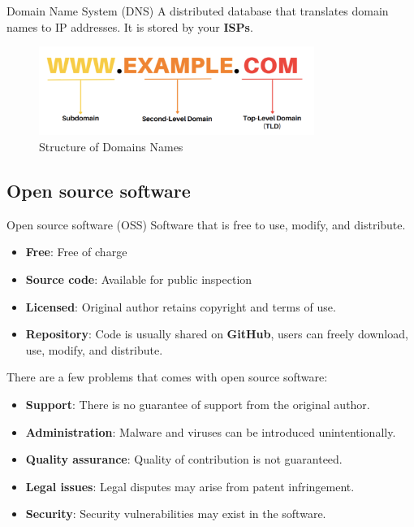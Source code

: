 \begin{definition}
    {Domain Name System (DNS)}
    A distributed database that translates domain names to IP addresses. It is stored by your \textbf{ISPs}.
\end{definition}

\begin{figure}[h!]
    \centering
    \includegraphics[width=0.8\textwidth]{images/tld.png}
    \caption{Structure of Domains Names}
    \label{fig:tld_structure}
\end{figure}

\subsection{Open source software}

\begin{definition}
    {Open source software (OSS)}
    Software that is free to use, modify, and distribute.
    \begin{itemize}
        \item \textbf{Free}: Free of charge
        \item \textbf{Source code}: Available for public inspection
        \item \textbf{Licensed}: Original author retains copyright and terms of use.
        \item \textbf{Repository}: Code is usually shared on \textbf{GitHub}, users can freely download, use, modify, and distribute.
    \end{itemize}
\end{definition}

There are a few problems that comes with open source software:

\begin{itemize}
    \item \textbf{Support}: There is no guarantee of support from the original author.
    \item \textbf{Administration}: Malware and viruses can be introduced unintentionally.
    \item \textbf{Quality assurance}: Quality of contribution is not guaranteed.
    \item \textbf{Legal issues}: Legal disputes may arise from patent infringement.
    \item \textbf{Security}: Security vulnerabilities may exist in the software.
\end{itemize}

